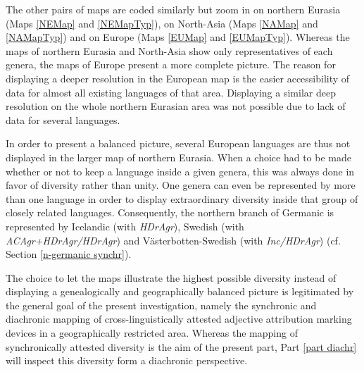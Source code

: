 The other pairs of maps are coded similarly but zoom in on northern Eurasia (Maps \ref{NEMap} and \ref{NEMapTyp}), on North-Asia (Maps \ref{NAMap} and \ref{NAMapTyp}) and on Europe (Maps \ref{EUMap} and \ref{EUMapTyp}). Whereas the maps of northern Eurasia and North-Asia show only representatives of each genera, the maps of Europe present a more complete picture. The reason for displaying a deeper resolution in the European map is the easier accessibility of data for almost all existing languages of that area. Displaying a similar deep resolution on the whole northern Eurasian area was not possible due to lack of data for several languages.

In order to present a balanced picture, several European languages are thus not displayed in the larger map of northern Eurasia. When a choice had to be made whether or not to keep a language inside a given genera, this was always done in favor of diversity rather than unity. One genera can even be represented by more than one language in order to display extraordinary diversity inside that group of closely related languages. Consequently, the northern branch of Germanic is represented by Icelandic (with \textit{HDrAgr}), Swedish (with \textit{ACAgr+HDrAgr/HDrAgr}) and Västerbotten-Swedish (with \textit{Inc/HDrAgr}) (cf. Section \ref{n-germanic synchr}).

The choice to let the maps illustrate the highest possible diversity instead of displaying a genealogically and geographically balanced picture is legitimated by the general goal of the present investigation, namely the synchronic and diachronic mapping of cross-linguistically attested adjective attribution marking devices in a geographically restricted area. Whereas the mapping of synchronically attested diversity is the aim of the present part, Part \ref{part diachr} will inspect this diversity form a diachronic perspective.
